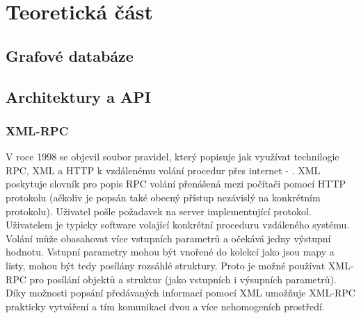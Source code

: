 \chapter{Teoretická část}

\section{Grafové databáze}

\section{Architektury a API} %






\subsection{XML-RPC}
V roce 1998 se objevil soubor pravidel, který popisuje jak využívat technilogie RPC, XML a HTTP k vzdálenému volání procedur přes internet - .\cite{Winner99} XML poskytuje slovník pro popis RPC volání přenášená mezi počítači pomocí HTTP protokolu (ačkoliv je popsán také obecný přístup nezávislý na konkrétním protokolu). Uživatel pošle požadavek na server implementující protokol. Uživatelem je typicky software volající konkrétní proceduru vzdáleného systému. Volání může obasahovat více vstupních parametrů a očekává jedny výstupní hodnotu. Vstupní parametry mohou být vnořené do kolekcí jako jsou mapy a listy, mohou být tedy posílány rozsáhlé struktury. Proto je možné používat XML-RPC pro posílání objektů a struktur (jako vstupních i výsupních parametrů). Díky možnosti popsání předávaných informací pomocí XML umožňuje XML-RPC prakticky vytváření  a tím komunikaci dvou a více nehomogeních prostředí.\cite{Laurent01}  

